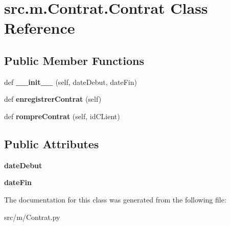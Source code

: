 \hypertarget{classsrc_1_1m_1_1_contrat_1_1_contrat}{}\section{src.\+m.\+Contrat.\+Contrat Class Reference}
\label{classsrc_1_1m_1_1_contrat_1_1_contrat}
\subsection*{Public Member Functions}
\begin{DoxyCompactItemize}
\item 
\hypertarget{classsrc_1_1m_1_1_contrat_1_1_contrat_a63451a32ce98d4514ac0f2898107764a}{}def {\bfseries \+\_\+\+\_\+init\+\_\+\+\_\+} (self, date\+Debut, date\+Fin)\label{classsrc_1_1m_1_1_contrat_1_1_contrat_a63451a32ce98d4514ac0f2898107764a}

\item 
\hypertarget{classsrc_1_1m_1_1_contrat_1_1_contrat_a8463f5b8995779985e9027d73bf4b503}{}def {\bfseries enregistrer\+Contrat} (self)\label{classsrc_1_1m_1_1_contrat_1_1_contrat_a8463f5b8995779985e9027d73bf4b503}

\item 
\hypertarget{classsrc_1_1m_1_1_contrat_1_1_contrat_ae5773d499f34a55901ba3838c86fd9b1}{}def {\bfseries rompre\+Contrat} (self, id\+C\+Lient)\label{classsrc_1_1m_1_1_contrat_1_1_contrat_ae5773d499f34a55901ba3838c86fd9b1}

\end{DoxyCompactItemize}
\subsection*{Public Attributes}
\begin{DoxyCompactItemize}
\item 
\hypertarget{classsrc_1_1m_1_1_contrat_1_1_contrat_ad38633294659f89e66652a6cb688754e}{}{\bfseries date\+Debut}\label{classsrc_1_1m_1_1_contrat_1_1_contrat_ad38633294659f89e66652a6cb688754e}

\item 
\hypertarget{classsrc_1_1m_1_1_contrat_1_1_contrat_a72ff4a9aa66b4933dbe4a88c69c8539c}{}{\bfseries date\+Fin}\label{classsrc_1_1m_1_1_contrat_1_1_contrat_a72ff4a9aa66b4933dbe4a88c69c8539c}

\end{DoxyCompactItemize}


The documentation for this class was generated from the following file\+:\begin{DoxyCompactItemize}
\item 
src/m/Contrat.\+py\end{DoxyCompactItemize}
